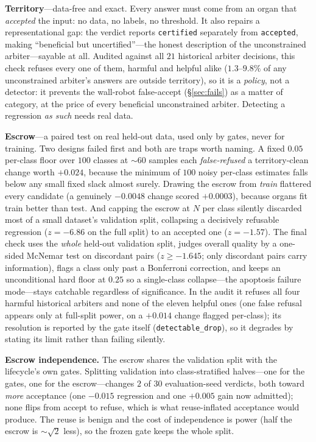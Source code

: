 \documentclass{article}
\begin{document}
\textbf{Territory}---data-free and exact. Every answer must come from an organ
that \emph{accepted} the input: no data, no labels, no threshold. It also
repairs a representational gap: the verdict reports \texttt{certified}
separately from \texttt{accepted}, making ``beneficial but uncertified''---the
honest description of the unconstrained arbiter---sayable at all. Audited
against all $21$ historical arbiter decisions, this check refuses every one of
them, harmful and helpful alike ($1.3$--$9.8\%$ of any unconstrained arbiter's
answers are outside territory), so it is a \emph{policy}, not a detector: it
prevents the wall-robot false-accept (\S\ref{sec:fails}) as a matter of
category, at the price of every beneficial unconstrained arbiter. Detecting a
regression \emph{as such} needs real data.

\textbf{Escrow}---a paired test on real held-out data, used only by gates,
never for training. Two designs failed first and both are traps worth naming.
A fixed $0.05$ per-class floor over $100$ classes at ${\sim}60$ samples each
\emph{false-refused} a territory-clean change worth $+0.024$, because the
minimum of $100$ noisy per-class estimates falls below any small fixed slack
almost surely. Drawing the escrow from \emph{train} flattered every candidate
(a genuinely $-0.0048$ change scored $+0.0003$), because organs fit train
better than test. And capping the escrow at $N$ per class silently discarded
most of a small dataset's validation split, collapsing a decisively refusable
regression ($z=-6.86$ on the full split) to an accepted one ($z=-1.57$). The
final check uses the \emph{whole} held-out validation split, judges overall
quality by a one-sided McNemar test on discordant pairs ($z \ge -1.645$; only
discordant pairs carry information), flags a class only past a Bonferroni
correction, and keeps an unconditional hard floor at $0.25$ so a single-class
collapse---the apoptosis failure mode---stays catchable regardless of
significance. In the audit it refuses all four harmful historical arbiters and
none of the eleven helpful ones (one false refusal appears only at
full-split power, on a $+0.014$ change flagged per-class); its resolution is
reported by the gate itself (\texttt{detectable\_drop}), so it degrades by
stating its limit rather than failing silently.

\textbf{Escrow independence.} The escrow shares the validation split with the
lifecycle's own gates. Splitting validation into class-stratified halves---one
for the gates, one for the escrow---changes $2$ of $30$ evaluation-seed
verdicts, both toward \emph{more} acceptance (one $-0.015$ regression and one
$+0.005$ gain now admitted); none flips from accept to refuse, which is what
reuse-inflated acceptance would produce. The reuse is benign and the cost of
independence is power (half the escrow is ${\sim}\sqrt 2$ less), so the frozen
gate keeps the whole split.
\end{document}
